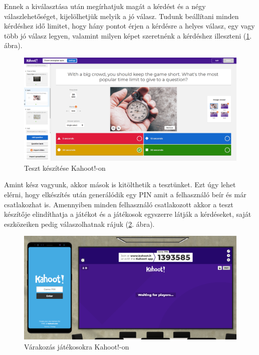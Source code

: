 Ennek a kiválasztása után megírhatjuk magát a kérdést és a négy válaszlehetőséget, kijelölhetjük melyik a jó válasz. Tudunk beállítani minden kérdéshez idő limitet, hogy hány pontot érjen a kérdésre a helyes válasz, egy vagy több jó válasz legyen, valamint milyen képet szeretnénk a kérdéshez illeszteni (\ref{fig:kahoot_1}. ábra).

\begin{figure}[h!]
	\centering
	\includegraphics[width=\linewidth]{images/kahoot_test_making.PNG}
	\caption{Teszt készítése Kahoot!-on}
	\label{fig:kahoot_1}
\end{figure}

Amint kész vagyunk, akkor mások is kitölthetik a tesztünket. Ezt úgy lehet elérni, hogy elkészítés után generálódik egy PIN amit a felhasználó beír és már csatlakozhat is. Amennyiben minden felhasználó csatlakozott akkor a teszt készítője elindíthatja a játékot és a játékosok egyszerre látják a kérdéseket, saját eszközeiken pedig válaszolhatnak rájuk (\ref{fig:kahoot_2}. ábra).

\begin{figure}[h!]
	\centering
	\includegraphics[width=\textwidth]{images/kahoot_play.png}
	\caption{Várakozás játékosokra Kahoot!-on}
	\label{fig:kahoot_2}
\end{figure}

